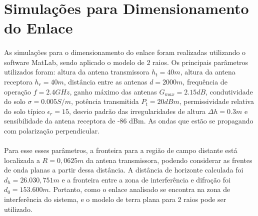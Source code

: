 \begin{itemize}

\end{itemize}


\section{Simulações para Dimensionamento do Enlace}
\paragraph{}As simulações para o dimensionamento do enlace foram realizadas utilizando o software MatLab, sendo aplicado o modelo de 2 raios. Os principais parâmetros utilizados foram: altura da antena transmissora $h_t = 40m$, altura da antena receptora $h_r = 40m$, distância entre as antenas $d = 2000m$, frequência de operação $\textit{f} = 2.4GHz$, ganho máximo das antenas $G_{max} = 2.15dB$, condutividade do solo $\sigma = 0.005 S/m$, potência transmitida $P_t = 20 dBm$, permissividade relativa do solo típico $\epsilon_r = 15$, desvio padrão das irregularidades de altura $\Delta h = 0.3m$ e sensibilidade da antena receptora de -86 dBm. As ondas que estão se propagando com polarização perpendicular.

\paragraph{}Para esse esses parâmetros, a fronteira para a região de campo distante está localizada a $R = 0,0625m$ da antena transmissora, podendo considerar as frentes de onda planas a partir dessa distância. A distância de horizonte calculada foi $d_h = 26.030,751m$
e a fronteira entre a zona de interferência e difração foi $d_0 = 153.600m$. Portanto, como o enlace analisado se encontra na zona de interferência do sistema, e o modelo de terra plana para 2 raios pode ser utilizado.


